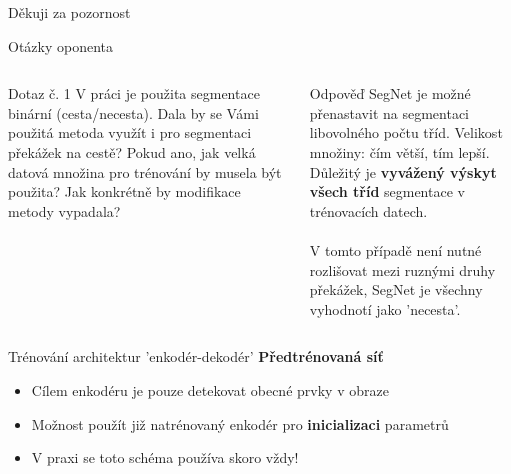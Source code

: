 \documentclass[aspectratio=1610]{beamer}
\begin{document}
\begin{frame}{}
	\centering
	{\Large Děkuji za pozornost}	
\end{frame}
\begin{frame}{Otázky oponenta}
\begin{columns}
\begin{exampleblock}{Dotaz č. 1}
V práci je použita segmentace binární (cesta/necesta). Dala by se Vámi použitá metoda využít i pro segmentaci překážek na cestě? Pokud ano, jak velká datová množina pro trénování by musela být použita? Jak konkrétně by modifikace metody vypadala?
\end{exampleblock}

\begin{block}{Odpověď}
SegNet je možné přenastavit na segmentaci libovolného počtu tříd. Velikost množiny: čím větší, tím lepší. Důležitý je \textbf{vyvážený výskyt všech tříd} segmentace v trénovacích datech. \\~\\

V tomto případě není nutné rozlišovat mezi ruznými druhy překážek, SegNet je všechny vyhodnotí jako 'necesta'.
\end{block}
\end{columns}
\end{frame}
\begin{frame}{Trénování architektur 'enkodér-dekodér'}
\textbf{Předtrénovaná síť}
\begin{itemize}
	\item Cílem enkodéru je pouze detekovat obecné prvky v obraze
	\item Možnost použít již natrénovaný enkodér pro \textbf{inicializaci} parametrů
	\item V praxi se toto schéma používa skoro vždy!
\end{itemize}
\end{frame}
\end{document}
